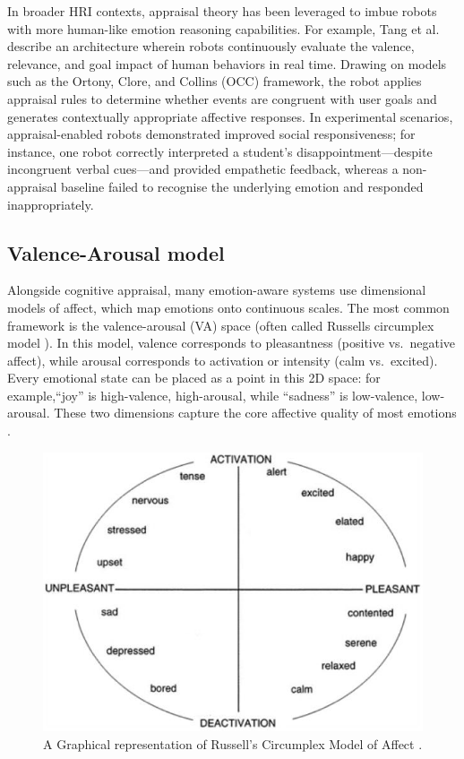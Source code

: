 In broader HRI contexts, appraisal theory has been leveraged to imbue robots with more human-like emotion reasoning capabilities. For example, Tang et al.\ \cite{Tang2025-ny} describe an architecture wherein robots continuously evaluate the valence, relevance, and goal impact of human behaviors in real time. Drawing on models such as the Ortony, Clore, and Collins (OCC) framework, the robot applies appraisal rules to determine whether events are congruent with user goals and generates contextually appropriate affective responses. In experimental scenarios, appraisal-enabled robots demonstrated improved social responsiveness; for instance, one robot correctly interpreted a student's disappointment—despite incongruent verbal cues—and provided empathetic feedback, whereas a non-appraisal baseline failed to recognise the underlying emotion and responded inappropriately.

\subsection{Valence-Arousal model}

Alongside cognitive appraisal, many emotion-aware systems use dimensional models of affect, which map emotions onto continuous scales. The most common framework is the valence-arousal (VA) space (often called Russells circumplex model \cite{Russell1980-cd}). In this model, valence corresponds to pleasantness (positive vs.\ negative affect), while arousal corresponds to activation or intensity (calm vs.\ excited). Every emotional state can be placed as a point in this 2D space: for example,``joy'' is high-valence, high-arousal, while ``sadness'' is low-valence, low-arousal. These two dimensions capture the core affective quality of most emotions \cite{Marmpena2018-tw}.

\begin{figure}[!htb]
    \centering{}
    \includegraphics[scale=0.80]{lit_review_images/RussellsCircumplex.jpg}
    \caption{A Graphical representation of Russell's Circumplex Model of Affect \cite{Russell1980-cd}.}
    \label{fig:RussellsCircumplex}
\end{figure}

